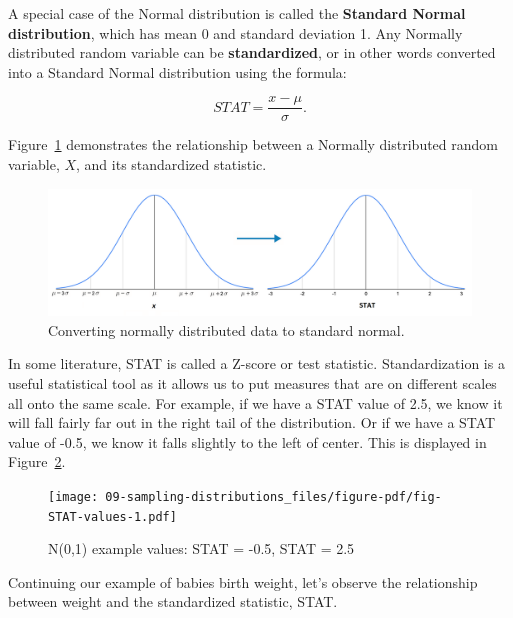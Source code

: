 \documentclass[
  letterpaper,
  DIV=11,
  numbers=noendperiod]{scrreprt}
\theoremstyle{definition}
\theoremstyle{remark}
\begin{document}
A special case of the Normal distribution is called the \textbf{Standard
Normal distribution}, which has mean 0 and standard deviation 1. Any
Normally distributed random variable can be \textbf{standardized}, or in
other words converted into a Standard Normal distribution using the
formula:

\[STAT = \frac{x-\mu}{\sigma}.\]

Figure~\ref{fig-standardization1} demonstrates the relationship between
a Normally distributed random variable, \(X\), and its standardized
statistic.

\begin{figure}

{\centering \includegraphics{images/standardization.png}

}

\caption{\label{fig-standardization1}Converting normally distributed
data to standard normal.}

\end{figure}

In some literature, STAT is called a Z-score or test statistic.
Standardization is a useful statistical tool as it allows us to put
measures that are on different scales all onto the same scale. For
example, if we have a STAT value of 2.5, we know it will fall fairly far
out in the right tail of the distribution. Or if we have a STAT value of
-0.5, we know it falls slightly to the left of center. This is displayed
in Figure~\ref{fig-STAT-values}.

\begin{figure}

{\centering \texttt{[image: 09-sampling-distributions\_files/figure-pdf/fig-STAT-values-1.pdf]}

}

\caption{\label{fig-STAT-values}N(0,1) example values: STAT = -0.5, STAT
= 2.5}

\end{figure}

Continuing our example of babies birth weight, let's observe the
relationship between weight and the standardized statistic, STAT.
\end{document}

